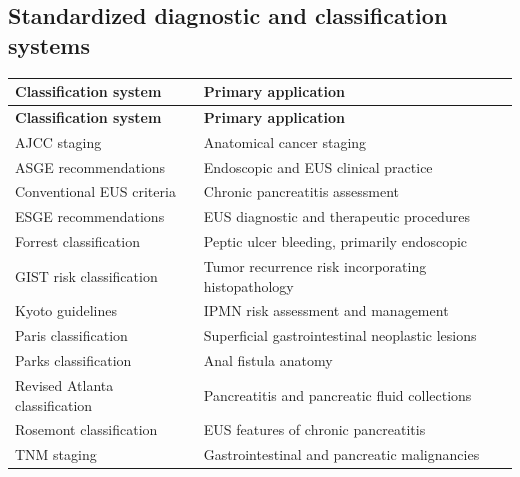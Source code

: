 \subsection{Standardized diagnostic and classification systems}
\begin{longtable}{@{}p{}p{}@{}}
\toprule
\textbf{Classification system} & \textbf{Primary application} \\
\midrule
\endfirsthead
\toprule
\textbf{Classification system} & \textbf{Primary application} \\
\midrule
\endhead
AJCC staging & Anatomical cancer staging \\
ASGE recommendations & Endoscopic and EUS clinical practice \\
Conventional EUS criteria & Chronic pancreatitis assessment \\
ESGE recommendations & EUS diagnostic and therapeutic procedures \\
Forrest classification & Peptic ulcer bleeding, primarily endoscopic \\
GIST risk classification & Tumor recurrence risk incorporating histopathology \\
Kyoto guidelines & IPMN risk assessment and management \\
Paris classification & Superficial gastrointestinal neoplastic lesions \\
Parks classification & Anal fistula anatomy \\
Revised Atlanta classification & Pancreatitis and pancreatic fluid collections \\
Rosemont classification & EUS features of chronic pancreatitis \\
TNM staging & Gastrointestinal and pancreatic malignancies \\
\bottomrule
\end{longtable}

